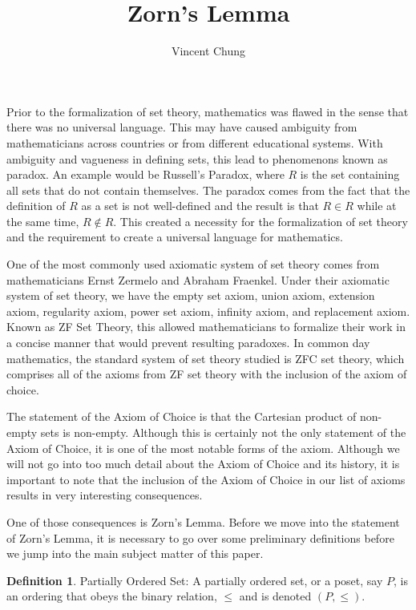 \documentclass[12pt]{article}
\theoremstyle{definition}
\newtheorem{definition}{Definition}
\begin{document}
\title{Zorn's Lemma}
\author{Vincent Chung}
\maketitle

	Prior to the formalization of set theory, mathematics was flawed in the sense that there was no universal language. This may have caused ambiguity from mathematicians across countries or from different educational systems. With ambiguity and vagueness in defining sets, this lead to phenomenons known as paradox. An example would be Russell's Paradox, where $R$ is the set containing all sets that do not contain themselves. The paradox comes from the fact that the definition of $R$ as a set is not well-defined and the result is that $R \in R$ while at the same time, $R \notin R$. This created a necessity for the formalization of set theory and the requirement to create a universal language for mathematics.
	
	One of the most commonly used axiomatic system of set theory comes from mathematicians Ernst Zermelo and Abraham Fraenkel. Under their axiomatic system of set theory, we have the empty set axiom, union axiom, extension axiom, regularity axiom, power set axiom, infinity axiom, and replacement axiom. Known as ZF Set Theory, this allowed mathematicians to formalize their work in a concise manner that would prevent resulting paradoxes. In common day mathematics, the standard system of set theory studied is ZFC set theory, which comprises all of the axioms from ZF set theory with the inclusion of the axiom of choice.
	
	The statement of the Axiom of Choice is that the Cartesian product of non-empty sets is non-empty. Although this is certainly not the only statement of the Axiom of Choice, it is one of the most notable forms of the axiom. Although we will not go into too much detail about the Axiom of Choice and its history, it is important to note that the inclusion of the Axiom of Choice in our list of axioms results in very interesting consequences.
	
	One of those consequences is Zorn's Lemma. Before we move into the statement of Zorn's Lemma, it is necessary to go over some preliminary definitions before we jump into the main subject matter of this paper.
	
	\theoremstyle{definition}
	\begin{definition}{Partially Ordered Set:}
	A partially ordered set, or a poset, say $P$, is an ordering that obeys the binary relation, $\leq$ and is denoted $(P,\leq)$.
	\end{definition}
	
\end{document}
